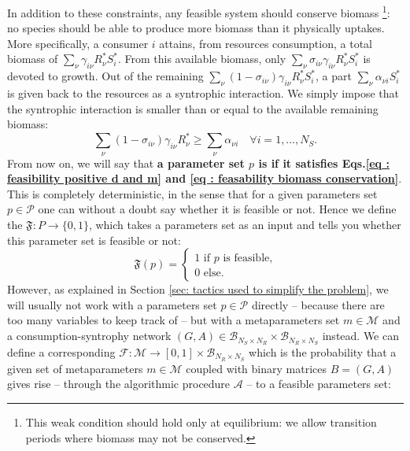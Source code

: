 \documentclass[12pt, titlepage]{report}
\begin{document}
In addition to these constraints, any feasible system should conserve biomass \footnote{This weak condition should hold only at equilibrium: we allow transition periods where biomass may not be conserved.}: no species should be able to produce more biomass than it physically uptakes. More specifically, a consumer $i$ attains, from resources consumption, a total biomass of $\sum_\nu \gamma_{i\nu}R^*_\nu S^*_i$.
From this available biomass, only $\sum_\nu \sigma_{i\nu}\gamma_{i\nu}R^*_\nu S^*_i$ is devoted to growth. Out of the remaining $\sum_\nu (1-\sigma_{i\nu})\gamma_{i\nu}R^*_\nu S^*_i$, a part $\sum_\nu \alpha_{\nu i} S^*_i$ is given back to the resources as a syntrophic interaction. We simply impose that the syntrophic interaction is smaller than or equal to the available remaining biomass:
\begin{equation}\label{eq : feasability biomass conservation}
 \sum_\nu (1-\sigma_{i\nu})\gamma_{i\nu}R^*_\nu  \geq \sum_\nu \alpha_{\nu i} \quad \forall i=1, \dots, N_S.
\end{equation}
From now on, we will say that \textbf{a parameter set $p$ is  if it satisfies Eqs.\eqref{eq : feasibility positive d and m} and \eqref{eq : feasability biomass conservation}}.
This is completely deterministic, in the sense that for a given parameters set $p \in \mathcal{P}$ one can without a doubt say whether it is feasible or not.
Hence we define the  $\mathfrak{F} : P \rightarrow \{ 0, 1 \}$, which takes a parameters set as an input and tells you whether this parameter set is feasible or not:
\begin{equation}
\mathfrak{F}(p)=
\begin{cases}
1 \text{ if }p \text{ is feasible,} \\
0 \text{ else.}
\end{cases}
\end{equation}
However, as explained in Section \ref{sec: tactics used to simplify the problem}, we will usually not work with a parameters set $p \in \mathcal{P}$ directly -- because there are too many variables to keep track of -- but with a metaparameters set $m \in \mathcal{M}$ and a consumption-syntrophy network $(G,A) \in \mathcal{B}_{N_S \times N_R} \times \mathcal{B}_{N_R \times N_S}$ instead. We can  define a corresponding
 $\mathcal{F} : \mathcal{M} \rightarrow [0, 1] \times \mathcal{B}_{N_R \times N_S}$ which is the probability that a given set of metaparameters $m \in \mathcal{M}$ coupled with binary matrices $B=(G, A)$ gives rise -- through the algorithmic procedure $\mathcal{A}$ -- to a feasible parameters set:
\end{document}
